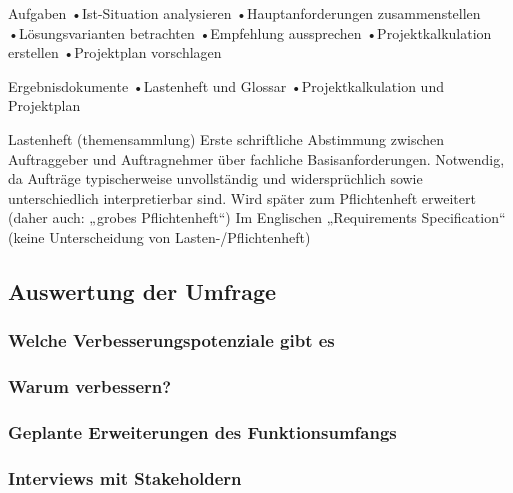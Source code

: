Aufgaben
•Ist-Situation analysieren
•Hauptanforderungen zusammenstellen
•Lösungsvarianten betrachten
•Empfehlung aussprechen
•Projektkalkulation erstellen
•Projektplan vorschlagen

Ergebnisdokumente
•Lastenheft und Glossar
•Projektkalkulation und Projektplan

Lastenheft (themensammlung)
Erste schriftliche Abstimmung zwischen Auftraggeber und Auftragnehmer über fachliche Basisanforderungen.
Notwendig, da Aufträge typischerweise unvollständig und widersprüchlich sowie unterschiedlich interpretierbar sind.
Wird später zum Pflichtenheft erweitert (daher auch: „grobes Pflichtenheft“)
Im Englischen „Requirements Specification“ (keine Unterscheidung von Lasten-/Pflichtenheft)

\subsection{Auswertung der Umfrage}

\subsubsection{Welche Verbesserungspotenziale gibt es}

\subsubsection{Warum verbessern?}

\subsubsection{Geplante Erweiterungen des Funktionsumfangs}

\subsubsection{Interviews mit Stakeholdern}